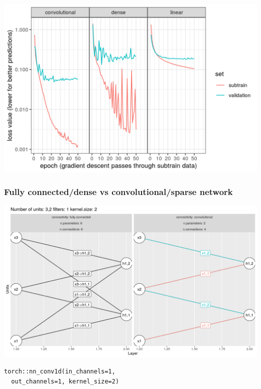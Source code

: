 \documentclass{beamer}
\begin{document}
\begin{frame}
  \includegraphics[width=\textwidth]{figure-validation-loss-three}
\end{frame}

\begin{frame}[fragile]
  \frametitle{Fully connected/dense vs convolutional/sparse network}
  \includegraphics[width=\textwidth]{figure-convolutional-filters-3-2-1}
\begin{verbatim}
torch::nn_conv1d(in_channels=1, 
  out_channels=1, kernel_size=2)
\end{verbatim}

\end{frame}
\end{document}
